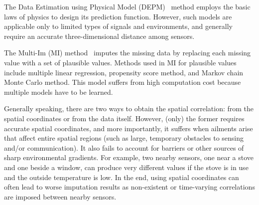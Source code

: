 The Data Estimation using Physical Model (DEPM)~\cite{li2008data} method employs the basic laws of physics to 
design its prediction function. %
However, such models are applicable only to limited types of signals and environments, and generally require 
an accurate three-dimensional distance among sensors.

The Multi-Im (MI) method~\cite{yuan2000multiple} imputes the missing data by replacing each missing value with a set of plausible values.
Methods used in MI for plausible values include multiple linear regression, propensity score method, and 
Markov chain Monte Carlo method.
This model suffers from high computation cost because multiple models have to be learned. 

Generally speaking, there are two ways to obtain the spatial
correlation: from the spatial coordinates or from the data itself.
However, (only) the former requires accurate spatial coordinates, and
more importantly, it suffers when ailments arise that affect entire
spatial regions (such as large, temporary obstacles to sensing and/or
communication).  It also fails to account for barriers or other
sources of sharp environmental gradients.  For example, two nearby
sensors, one near a stove and one beside a window, can produce very
different values if the stove is in use and the outside temperature is
low.  In the end, using spatial coordinates can often lead to worse
imputation results as non-existent or time-varying correlations are
imposed between nearby sensors.

